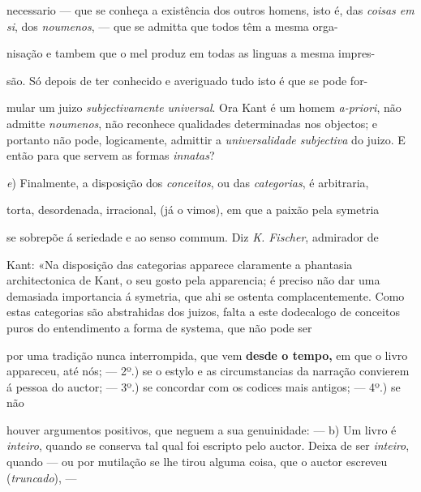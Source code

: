 necessario --- que se conheça a existência dos outros homens, isto é, das \emph{coisas em si}, dos \emph{noumenos}, --- que se admitta que todos têm a mesma orga-

nisação e tambem que o mel produz em todas as linguas a mesma impres-

são. Só depois de ter conhecido e averiguado tudo isto é que se pode for-

mular um juizo \emph{subjectivamente universal}. Ora Kant é um homem \emph{a-priori}, não admitte \emph{noumenos}, não reconhece qualidades determinadas nos objectos; e portanto não pode, logicamente, admittir a \emph{universalidade subjectiva} do juizo. E então para que servem as formas \emph{innatas}?

\emph{e}) Finalmente, a disposição dos \emph{conceitos}, ou das \emph{categorias}, é arbitraria,

torta, desordenada, irracional, (já o vimos), em que a paixão pela symetria

se sobrepõe á seriedade e ao senso commum. Diz \emph{K. Fischer}, admirador de

Kant: «Na disposição das categorias apparece claramente a phantasia architectonica de Kant, o seu gosto pela apparencia; é preciso não dar uma demasiada importancia á symetria, que ahi se ostenta complacentemente. Como estas categorias são abstrahidas dos juizos, falta a este dodecalogo de conceitos puros do entendimento a forma de systema, que não pode ser

  por uma tradição nunca interrompida, que vem \textbf{desde o tempo,} em que o livro appareceu, até nós; --- 2º.) se o estylo e as circumstancias da narração convierem á pessoa do auctor; --- 3º.) se concordar com os codices mais antigos; --- 4º.) se não

  houver argumentos positivos, que neguem a sua genuinidade: --- b) Um livro é \emph{inteiro}, quando se conserva tal qual foi escripto pelo auctor. Deixa de ser \emph{inteiro}, quando --- ou por mutilação se lhe tirou alguma coisa, que o auctor escreveu (\emph{truncado}), ---


